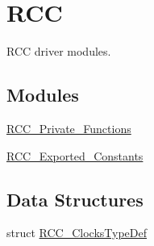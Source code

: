 \hypertarget{group___r_c_c}{}\section{R\+CC}
\label{group___r_c_c}


R\+CC driver modules.  


\subsection*{Modules}
\begin{DoxyCompactItemize}
\item 
\mbox{\hyperlink{group___r_c_c___private___functions}{R\+C\+C\+\_\+\+Private\+\_\+\+Functions}}
\item 
\mbox{\hyperlink{group___r_c_c___exported___constants}{R\+C\+C\+\_\+\+Exported\+\_\+\+Constants}}
\end{DoxyCompactItemize}
\subsection*{Data Structures}
\begin{DoxyCompactItemize}
\item 
struct \mbox{\hyperlink{struct_r_c_c___clocks_type_def}{R\+C\+C\+\_\+\+Clocks\+Type\+Def}}
\end{DoxyCompactItemize}
